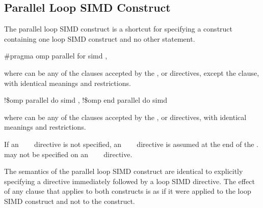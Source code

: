 \subsection{Parallel Loop SIMD Construct}
\label{subsec:Parallel Loop SIMD Construct}
\summary
The parallel loop SIMD construct is a shortcut for specifying a  construct 
containing one loop SIMD construct and no other statement.

\begin{samepage}
\syntax
\ccppspecificstart
\begin{boxedcode}
\#pragma omp parallel for simd \plc{[clause[ [},\plc{] clause] ... ] new-line}
\end{boxedcode}

where  can be any of the clauses accepted by the ,  or  
directives, except the  clause, with identical meanings and restrictions.
\ccppspecificend
\end{samepage}

\begin{samepage}
\fortranspecificstart
\begin{boxedcode}
!\$omp parallel do simd \plc{[clause[ [},\plc{] clause] ... ]}
!\$omp end parallel do simd
\end{boxedcode}
\end{samepage}

where  can be any of the clauses accepted by the ,  or  
directives, with identical meanings and restrictions.

\begin{samepage}
If an ~~~ directive is not specified, an 
~~~ directive is assumed at the end of the 
.  may not be specified on 
an ~~~ directive.
\fortranspecificend
\end{samepage}

\descr
The semantics of the parallel loop SIMD construct are identical to explicitly specifying 
a  directive immediately followed by a loop SIMD directive. The effect of 
any clause that applies to both constructs is as if it were applied to the loop SIMD 
construct and not to the  construct.

